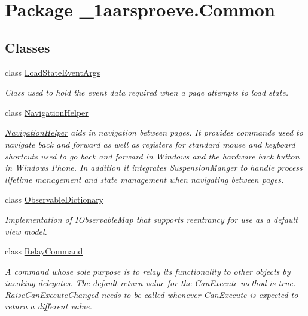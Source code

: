 \hypertarget{namespace__1aarsproeve_1_1_common}{}\section{Package \+\_\+1aarsproeve.\+Common}
\label{namespace__1aarsproeve_1_1_common}
\subsection*{Classes}
\begin{DoxyCompactItemize}
\item 
class \hyperlink{class__1aarsproeve_1_1_common_1_1_load_state_event_args}{Load\+State\+Event\+Args}
\begin{DoxyCompactList}\small\item\em Class used to hold the event data required when a page attempts to load state. \end{DoxyCompactList}\item 
class \hyperlink{class__1aarsproeve_1_1_common_1_1_navigation_helper}{Navigation\+Helper}
\begin{DoxyCompactList}\small\item\em \hyperlink{class__1aarsproeve_1_1_common_1_1_navigation_helper}{Navigation\+Helper} aids in navigation between pages. It provides commands used to navigate back and forward as well as registers for standard mouse and keyboard shortcuts used to go back and forward in Windows and the hardware back button in Windows Phone. In addition it integrates Suspension\+Manger to handle process lifetime management and state management when navigating between pages. \end{DoxyCompactList}\item 
class \hyperlink{class__1aarsproeve_1_1_common_1_1_observable_dictionary}{Observable\+Dictionary}
\begin{DoxyCompactList}\small\item\em Implementation of I\+Observable\+Map that supports reentrancy for use as a default view model. \end{DoxyCompactList}\item 
class \hyperlink{class__1aarsproeve_1_1_common_1_1_relay_command}{Relay\+Command}
\begin{DoxyCompactList}\small\item\em A command whose sole purpose is to relay its functionality to other objects by invoking delegates. The default return value for the Can\+Execute method is \textquotesingle{}true\textquotesingle{}. \hyperlink{class__1aarsproeve_1_1_common_1_1_relay_command_a90744bca5c47a6c212fd7d0cb89182f1}{Raise\+Can\+Execute\+Changed} needs to be called whenever \hyperlink{class__1aarsproeve_1_1_common_1_1_relay_command_a3c52d00e1d9ab7ab06cc4244b50fbee2}{Can\+Execute} is expected to return a different value. \end{DoxyCompactList}\item 

\end{DoxyCompactItemize}
